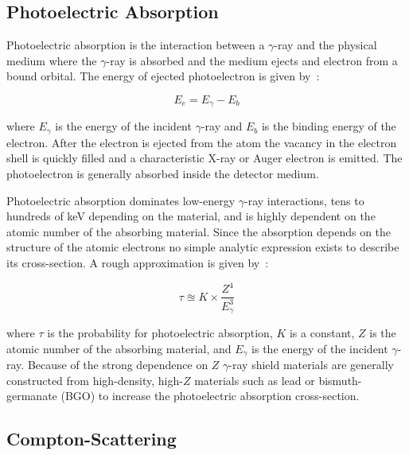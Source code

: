 \documentclass[cnatzke_thesis_proposal.tex]{subfiles}
\begin{document}
\subsection{Photoelectric Absorption}
Photoelectric absorption is the interaction between a $\gamma$-ray and the physical medium where the $\gamma$-ray is absorbed and the medium ejects and electron from a bound orbital. The energy of ejected photoelectron is given by~\cite{krane_introductory_1987}: 

\begin{equation}
    E_e = E_\gamma - E_b
\end{equation}

where $E_\gamma$ is the energy of the incident $\gamma$-ray and $E_b$ is the binding energy of the electron. After the electron is ejected from the atom the vacancy in the electron shell is quickly filled and a characteristic X-ray or Auger electron is emitted. The photoelectron is generally absorbed inside the detector medium.

Photoelectric absorption dominates low-energy $\gamma$-ray interactions, tens to hundreds of keV depending on the material, and is highly dependent on the atomic number of the absorbing material. Since the absorption depends on the structure of the atomic electrons no simple analytic expression exists to describe its cross-section. A rough approximation is given by~\cite{krane_introductory_1987}: 

\begin{equation}
    \tau \approxeq K \times \frac{Z^4}{E^{3}_\gamma}
\end{equation}

where $\tau$ is the probability for photoelectric absorption, $K$ is a constant, $Z$ is the atomic number of the absorbing material, and $E_\gamma$ is the energy of the incident $\gamma$-ray. Because of the strong dependence on $Z$ $\gamma$-ray shield materials are generally constructed from high-density, high-$Z$ materials such as lead or bismuth-germanate (BGO) to increase the photoelectric absorption cross-section.

\subsection{Compton-Scattering}
\label{sec:compton_scatter}
\end{document}
